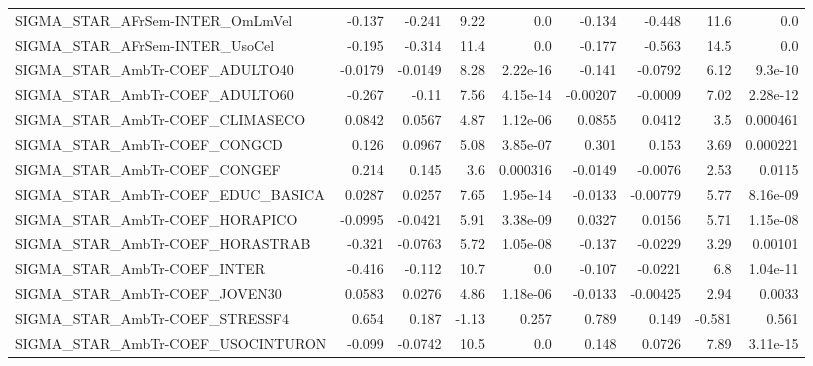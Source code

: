 \begin{tabular}{lrrrrrrrr}
SIGMA\_STAR\_AFrSem-INTER\_OmLmVel       &      -0.137 &       -0.241 &     9.22 &      0.0 &     -0.134 &      -0.448 &         11.6 &           0.0 \\
SIGMA\_STAR\_AFrSem-INTER\_UsoCel        &      -0.195 &       -0.314 &     11.4 &      0.0 &     -0.177 &      -0.563 &         14.5 &           0.0 \\
SIGMA\_STAR\_AmbTr-COEF\_ADULTO40        &     -0.0179 &      -0.0149 &     8.28 & 2.22e-16 &     -0.141 &     -0.0792 &         6.12 &       9.3e-10 \\
SIGMA\_STAR\_AmbTr-COEF\_ADULTO60        &      -0.267 &        -0.11 &     7.56 & 4.15e-14 &   -0.00207 &     -0.0009 &         7.02 &      2.28e-12 \\
SIGMA\_STAR\_AmbTr-COEF\_CLIMASECO       &      0.0842 &       0.0567 &     4.87 & 1.12e-06 &     0.0855 &      0.0412 &          3.5 &      0.000461 \\
SIGMA\_STAR\_AmbTr-COEF\_CONGCD          &       0.126 &       0.0967 &     5.08 & 3.85e-07 &      0.301 &       0.153 &         3.69 &      0.000221 \\
SIGMA\_STAR\_AmbTr-COEF\_CONGEF          &       0.214 &        0.145 &      3.6 & 0.000316 &    -0.0149 &     -0.0076 &         2.53 &        0.0115 \\
SIGMA\_STAR\_AmbTr-COEF\_EDUC\_BASICA     &      0.0287 &       0.0257 &     7.65 & 1.95e-14 &    -0.0133 &    -0.00779 &         5.77 &      8.16e-09 \\
SIGMA\_STAR\_AmbTr-COEF\_HORAPICO        &     -0.0995 &      -0.0421 &     5.91 & 3.38e-09 &     0.0327 &      0.0156 &         5.71 &      1.15e-08 \\
SIGMA\_STAR\_AmbTr-COEF\_HORASTRAB       &      -0.321 &      -0.0763 &     5.72 & 1.05e-08 &     -0.137 &     -0.0229 &         3.29 &       0.00101 \\
SIGMA\_STAR\_AmbTr-COEF\_INTER           &      -0.416 &       -0.112 &     10.7 &      0.0 &     -0.107 &     -0.0221 &          6.8 &      1.04e-11 \\
SIGMA\_STAR\_AmbTr-COEF\_JOVEN30         &      0.0583 &       0.0276 &     4.86 & 1.18e-06 &    -0.0133 &    -0.00425 &         2.94 &        0.0033 \\
SIGMA\_STAR\_AmbTr-COEF\_STRESSF4        &       0.654 &        0.187 &    -1.13 &    0.257 &      0.789 &       0.149 &       -0.581 &         0.561 \\
SIGMA\_STAR\_AmbTr-COEF\_USOCINTURON     &      -0.099 &      -0.0742 &     10.5 &      0.0 &      0.148 &      0.0726 &         7.89 &      3.11e-15 \\

\end{tabular}
